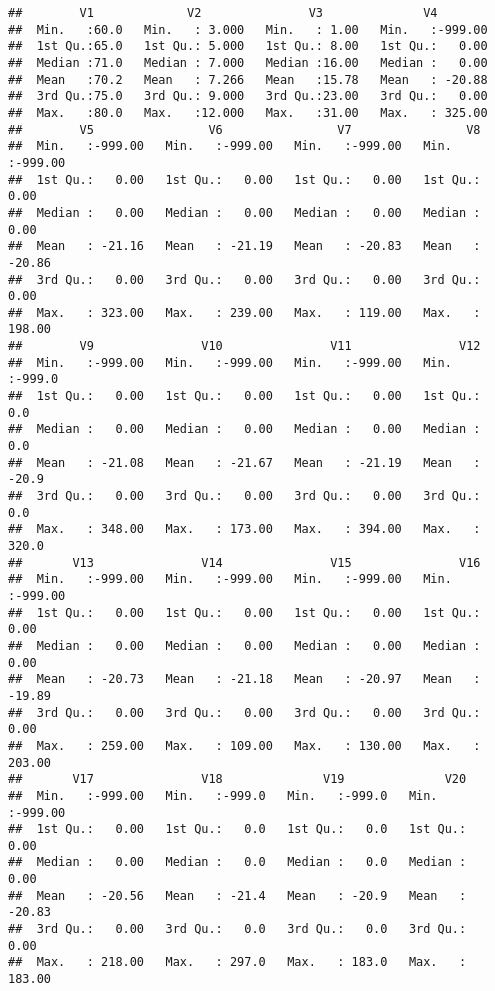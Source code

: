 \documentclass[]{article}
\begin{document}
\begin{verbatim}
##        V1             V2               V3              V4         
##  Min.   :60.0   Min.   : 3.000   Min.   : 1.00   Min.   :-999.00  
##  1st Qu.:65.0   1st Qu.: 5.000   1st Qu.: 8.00   1st Qu.:   0.00  
##  Median :71.0   Median : 7.000   Median :16.00   Median :   0.00  
##  Mean   :70.2   Mean   : 7.266   Mean   :15.78   Mean   : -20.88  
##  3rd Qu.:75.0   3rd Qu.: 9.000   3rd Qu.:23.00   3rd Qu.:   0.00  
##  Max.   :80.0   Max.   :12.000   Max.   :31.00   Max.   : 325.00  
##        V5                V6                V7                V8         
##  Min.   :-999.00   Min.   :-999.00   Min.   :-999.00   Min.   :-999.00  
##  1st Qu.:   0.00   1st Qu.:   0.00   1st Qu.:   0.00   1st Qu.:   0.00  
##  Median :   0.00   Median :   0.00   Median :   0.00   Median :   0.00  
##  Mean   : -21.16   Mean   : -21.19   Mean   : -20.83   Mean   : -20.86  
##  3rd Qu.:   0.00   3rd Qu.:   0.00   3rd Qu.:   0.00   3rd Qu.:   0.00  
##  Max.   : 323.00   Max.   : 239.00   Max.   : 119.00   Max.   : 198.00  
##        V9               V10               V11               V12        
##  Min.   :-999.00   Min.   :-999.00   Min.   :-999.00   Min.   :-999.0  
##  1st Qu.:   0.00   1st Qu.:   0.00   1st Qu.:   0.00   1st Qu.:   0.0  
##  Median :   0.00   Median :   0.00   Median :   0.00   Median :   0.0  
##  Mean   : -21.08   Mean   : -21.67   Mean   : -21.19   Mean   : -20.9  
##  3rd Qu.:   0.00   3rd Qu.:   0.00   3rd Qu.:   0.00   3rd Qu.:   0.0  
##  Max.   : 348.00   Max.   : 173.00   Max.   : 394.00   Max.   : 320.0  
##       V13               V14               V15               V16         
##  Min.   :-999.00   Min.   :-999.00   Min.   :-999.00   Min.   :-999.00  
##  1st Qu.:   0.00   1st Qu.:   0.00   1st Qu.:   0.00   1st Qu.:   0.00  
##  Median :   0.00   Median :   0.00   Median :   0.00   Median :   0.00  
##  Mean   : -20.73   Mean   : -21.18   Mean   : -20.97   Mean   : -19.89  
##  3rd Qu.:   0.00   3rd Qu.:   0.00   3rd Qu.:   0.00   3rd Qu.:   0.00  
##  Max.   : 259.00   Max.   : 109.00   Max.   : 130.00   Max.   : 203.00  
##       V17               V18              V19              V20         
##  Min.   :-999.00   Min.   :-999.0   Min.   :-999.0   Min.   :-999.00  
##  1st Qu.:   0.00   1st Qu.:   0.0   1st Qu.:   0.0   1st Qu.:   0.00  
##  Median :   0.00   Median :   0.0   Median :   0.0   Median :   0.00  
##  Mean   : -20.56   Mean   : -21.4   Mean   : -20.9   Mean   : -20.83  
##  3rd Qu.:   0.00   3rd Qu.:   0.0   3rd Qu.:   0.0   3rd Qu.:   0.00  
##  Max.   : 218.00   Max.   : 297.0   Max.   : 183.0   Max.   : 183.00  

\end{verbatim}
\end{document}
